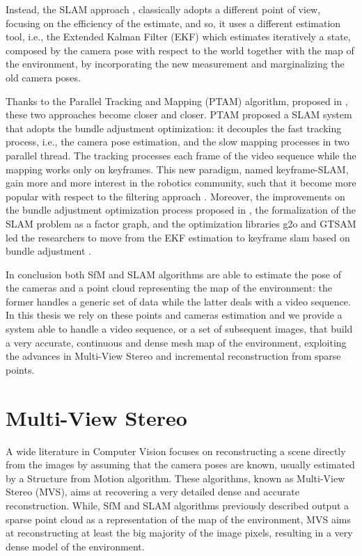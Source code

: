 Instead, the SLAM approach \cite{davison2007monoslam,ceriani2014single,grasa2011ekf}, classically adopts a different point of view, focusing on the efficiency of the estimate, and so, it uses a different estimation tool, i.e., the Extended Kalman Filter (EKF) which estimates iteratively a state, composed by the camera pose with respect to the world together with the map of the environment, by incorporating the new measurement and marginalizing the old camera poses.  


Thanks to the Parallel Tracking and Mapping (PTAM) algorithm, proposed in \cite{klein_murray07}, these two approaches become closer and closer. PTAM proposed a SLAM system that adopts the bundle adjustment optimization: it decouples the fast tracking process, i.e., the camera pose estimation, and the slow mapping processes in two parallel thread.  
The tracking processes each frame of the video sequence while the mapping works only on keyframes. 
This new paradigm, named keyframe-SLAM, gain more and more interest in the robotics community, such that it become more popular with respect to the filtering approach \cite{strasdat2010real}.
Moreover, the improvements on the bundle adjustment optimization process proposed in \cite{kaess2008isam},  the formalization of the SLAM problem as a factor graph\cite{thrun2006graph}, and the optimization libraries g2o \cite{kummerle2011g} and GTSAM \cite{dellaert2012factor} led the researchers to move from the EKF estimation to keyframe slam based on bundle adjustment \cite{strasdat11,sunderhauf2012towards,johannsson2013temporally}. 


In conclusion both SfM and SLAM algorithms are able to estimate the pose of the cameras and a point cloud representing the map of the environment: the former handles a generic set of data while the latter deals with a video sequence. 
In this thesis we rely on these points and cameras estimation and we provide a system able to handle a video sequence, or a set of subsequent images, that build a very accurate, continuous and dense mesh map of the environment, exploiting the advances in Multi-View Stereo and incremental reconstruction from sparse points.

\section{Multi-View Stereo}


A wide literature in Computer Vision focuses on reconstructing a scene directly from the images by assuming that the camera poses are known, usually estimated by a Structure from Motion algorithm.
These algorithms, known as Multi-View Stereo (MVS), aims at recovering a very detailed dense and accurate reconstruction. 
While, SfM and SLAM algorithms previously described output a sparse point cloud as a representation of the map of the environment, MVS aims at reconstructing at least the big majority of the image pixels, resulting in a very dense model of the environment.

